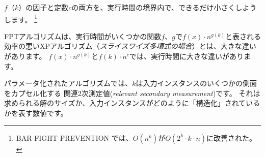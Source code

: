 \documentclass{jsarticle}
\begin{document}
$f（k）$の因子と定数$c$の両方を、実行時間の境界内で、できるだけ小さくしようします。
\footnote{\textsc{BAR FIGHT PREVENTION} では、$O(n^k)$が$ O(2^k \cdot k \cdot n)$に改善された。}

FPTアルゴリズムは、実行時間がいくつかの関数$f$、$g$で$f(x) \cdot n^{g(k)}$と表される
効率の悪いXPアルゴリズム（{\it スライスワイズ多項式の場合}）とは、大きな違いがあります。 
$f(x) \cdot n^{g(k)}$と$f(k) \cdot n^c$では、実行時間に大きな違いがあります。



パラメータ化されたアルゴリズムでは、$k$は入力インスタンスのいくつかの側面をカプセル化する
関連2次測定値({\it relevant secondary measurement})です。
それは求められる解のサイズか、入力インスタンスがどのように「構造化」されているかを表す数値です。
\end{document}
